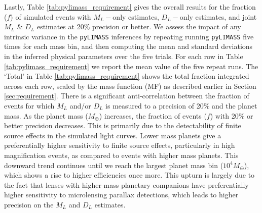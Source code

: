 \documentclass[twocolumn]{aastex631}
\begin{document}
\indent Lastly, Table \ref{tab:pylimass_requirement} gives the overall results for the fraction ($f$) of simulated events with $M_L-$only estimates, $D_L-$only estimates, and joint $M_L$ \& $D_L$ estimates at 20\% precision or better. We assess the impact of any intrinsic variance in the \texttt{pyLIMASS} inferences by repeating running \texttt{pyLIMASS} five times for each mass bin, and then computing the mean and standard deviations in the inferred physical parameters over the five trials. For each row in Table \ref{tab:pylimass_requirement} we report the mean value of the five repeat runs. The `Total' in Table \ref{tab:pylimass_requirement} shows the total fraction integrated across each row, scaled by the \cite{cassan:2012a} mass function (MF) as described earlier in Section \ref{sec:requirement}. There is a significant anti-correlation between the fraction of events for which $M_L$ and/or $D_L$ is measured to a precision of 20\% and the planet mass. As the planet mass ($M_{\oplus}$) increases, the fraction of events ($f$) with 20\% or better precision decreases. This is primarily due to the detectability of finite source effects in the simulated light curves. Lower mass planets give a preferentially higher sensitivity to finite source effects, particularly in high magnification events, as compared to events with higher mass planets. This downward trend continues until we reach the largest planet mass bin ($10^4M_{\oplus}$), which shows a rise to higher efficiencies once more. This upturn is largely due to the fact that lenses with higher-mass planetary companions have preferentially higher sensitivity to microlensing parallax detections, which leads to higher precision on the $M_L$ and $D_L$ estimates. \\
\end{document}
